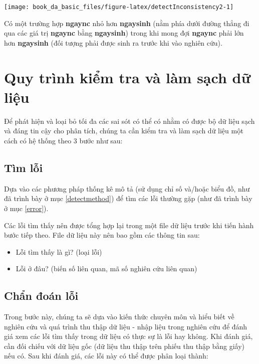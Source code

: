 \documentclass[]{tufte-book}
\providecommand{\tightlist}{%
  \setlength{\itemsep}{0pt}\setlength{\parskip}{0pt}}
\begin{document}
\begin{center}\texttt{[image: book\_da\_basic\_files/figure-latex/detectInconsistency2-1]} \end{center}

Có một trường hợp \textbf{ngaync} nhỏ hơn \textbf{ngaysinh} (nằm phía dưới đường thẳng đi qua các giá trị \textbf{ngaync} bằng \textbf{ngaysinh}) trong khi mong đợi \textbf{ngaync} phải lớn hơn \textbf{ngaysinh} (đối tượng phải được sinh ra trước khi vào nghiên cứu).

\hypertarget{quy-trinh-kim-tra-va-lam-sach-d-liu}{%
\section{Quy trình kiểm tra và làm sạch dữ liệu}\label{quy-trinh-kim-tra-va-lam-sach-d-liu}}

Để phát hiện và loại bỏ tối đa các sai sót có thể có nhằm có được bộ dữ liệu sạch và đáng tin cậy cho phân tích, chúng ta cần kiểm tra và làm sạch dữ liệu một cách có hệ thống theo 3 bước như sau:

\hypertarget{tim-li}{%
\subsection{Tìm lỗi}\label{tim-li}}

Dựa vào các phương pháp thống kê mô tả (sử dụng chỉ số và/hoặc biểu đồ, như đã trình bày ở mục \ref{detectmethod}) để tìm các lỗi thường gặp (như đã trình bày ở mục \ref{error}).

Các lỗi tìm thấy nên được tổng hợp lại trong một file dữ liệu trước khi tiến hành bước tiếp theo. File dữ liệu này nên bao gồm các thông tin sau:

\begin{itemize}
\tightlist
\item
  Lỗi tìm thấy là gì? (loại lỗi)
\item
  Lỗi ở đâu? (biến số liên quan, mã số nghiên cứu liên quan)
\end{itemize}

\hypertarget{chn-oan-li}{%
\subsection{Chẩn đoán lỗi}\label{chn-oan-li}}

Trong bước này, chúng ta sẽ dựa vào kiến thức chuyên môn và hiểu biết về nghiên cứu và quá trình thu thập dữ liệu - nhập liệu trong nghiên cứu để đánh giá xem các lỗi tìm thấy trong dữ liệu có thực sự là lỗi hay không. Khi đánh giá, cần đối chiếu với dữ liệu gốc (dữ liệu thu thập trên phiếu thu thập bằng giấy) nếu có. Sau khi đánh giá, các lỗi này có thể được phân loại thành:
\end{document}
